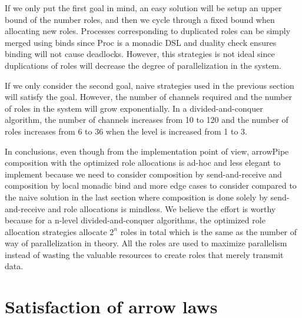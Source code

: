 If we only put the first goal in mind, an easy solution will be setup an upper bound of the number roles, and then we cycle through a fixed bound when allocating new roles. Processes corresponding to duplicated roles can be simply merged using binds since Proc is a monadic DSL and duality check ensures binding will not cause deadlocks. However, this strategies is not ideal since duplications of roles will decrease the degree of parallelization in the system.

If we only consider the second goal, naive strategies used in the previous section will satisfy the goal. However, the number of channels required and the number of roles in the system will grow exponentially. In a divided-and-conquer algorithm, the number of channels increases from 10 to 120 and the number of roles increases from 6 to 36 when the level is increased from 1 to 3.

In conclusions, even though from the implementation point of view, arrowPipe composition with the optimized role allocations is ad-hoc and less elegant to implement because we need to consider composition by send-and-receive and composition by local monadic bind and more edge cases to consider compared to the naive solution in the last section where composition is done solely by send-and-receive and role allocations is mindless. We believe the effort is worthy because for a n-level divided-and-conquer algorithms, the optimized role allocation strategies allocate $2^n$ roles in total which is the same as the number of way of parallelization in theory. All the roles are used to maximize parallelism instead of wasting the valuable resources to create roles that merely transmit data.
\section{Satisfaction of arrow laws}
